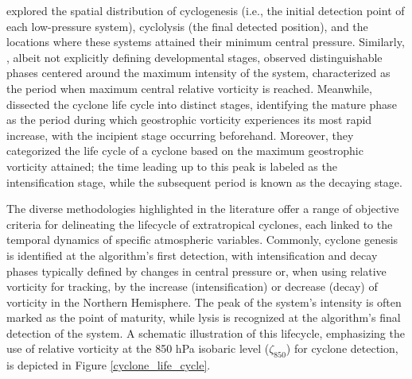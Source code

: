 \citet{trigo2006climatology} explored the spatial distribution of cyclogenesis (i.e., the initial detection point of each low-pressure system), cyclolysis (the final detected position), and the locations where these systems attained their minimum central pressure. Similarly, \citet{bengtsson2009will}, albeit not explicitly defining developmental stages, observed distinguishable phases centered around the maximum intensity of the system, characterized as the period when maximum central relative vorticity is reached. Meanwhile, \citet{azad2014vorticity,azad2014vorticity2} dissected the cyclone life cycle into distinct stages, identifying the mature phase as the period during which geostrophic vorticity experiences its most rapid increase, with the incipient stage occurring beforehand. Moreover, they categorized the life cycle of a cyclone based on the maximum geostrophic vorticity attained; the time leading up to this peak is labeled as the intensification stage, while the subsequent period is known as the decaying stage. 

The diverse methodologies highlighted in the literature offer a range of objective criteria for delineating the lifecycle of extratropical cyclones, each linked to the temporal dynamics of specific atmospheric variables. Commonly, cyclone genesis is identified at the algorithm's first detection, with intensification and decay phases typically defined by changes in central pressure or, when using relative vorticity for tracking, by the increase (intensification) or decrease (decay) of vorticity in the Northern Hemisphere. The peak of the system's intensity is often marked as the point of maturity, while lysis is recognized at the algorithm's final detection of the system.  A schematic illustration of this lifecycle, emphasizing the use of relative vorticity at the 850 hPa isobaric level ($\zeta_{850}$) for cyclone detection, is depicted in Figure \ref{cyclone_life_cycle}.

